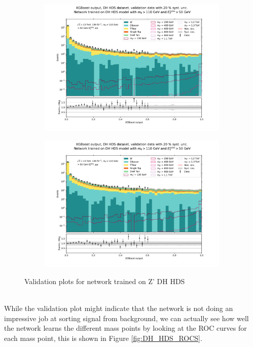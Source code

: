 \documentclass[12pt, a4paper]{book}
\begin{document}
\begin{figure}[!ht]
	\centering
	\begin{subfigure}[b]{0.49\textwidth}
      \centering
      \includegraphics[width=1\textwidth]{XGBoost/DH_HDS/VAL_ee.pdf}
      \end{subfigure}
   \hfill
   \begin{subfigure}[b]{0.49\textwidth}
      \centering
      \includegraphics[width=1\textwidth]{XGBoost/DH_HDS/VAL_uu.pdf}
      \end{subfigure}
   \caption{Validation plots for network trained on Z' DH HDS}\label{fig:DH_HDS_vals}
\end{figure}
\\While the validation plot might indicate that the network is not doing an impressive job at sorting signal from background, we can actually see how well the network learns the different mass points by looking at the ROC curves for each mass point, this is shown in Figure \ref{fig:DH_HDS_ROCS}. 
\end{document}

